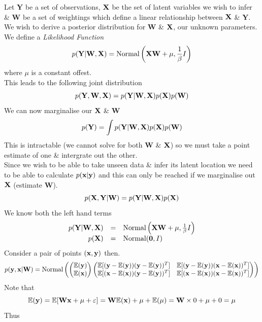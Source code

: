 \documentclass[11pt,a4paper]{article}
\begin{document}
Let $\textbf{Y}$ be a set of observations, $\textbf{X}$ be the set of latent variables we wish to infer \& $\textbf{W}$ be a set of weightings which define a linear relationship between $\textbf{X}$ \& $\textbf{Y}$.\\
We wish to derive a posterior distribution for $\textbf{W}$ \& $\textbf{X}$, our unknown parameters.\\
We define a \textit{Likelihood Function}
$$p(\textbf{Y}|\textbf{W},\textbf{X})=\text{Normal}\left(\textbf{X}\textbf{W}+\mu,\frac1\beta I\right)$$
where $\mu$ is a constant offest.\\
This leads to the following joint distribution
$$p(\textbf{Y},\textbf{W},\textbf{X})=p(\textbf{Y}|\textbf{W},\textbf{X})p(\textbf{X})p(\textbf{W})$$
We can now marginalise our $\textbf{X}$ \& $\textbf{W}$
$$p(\textbf{Y})=\int p(\textbf{Y}|\textbf{W},\textbf{X})p(\textbf{X})p(\textbf{W})$$
This is intractable (\ie we cannot solve for both $\textbf{W}$ \& $\textbf{X}$) so we must take a point estimate of one \& intergrate out the other.\\
Since we wish to be able to take unseen data \& infer its latent location we need to be able to calculate $p(\textbf{x}|\textbf{y})$ and this can only be reached if we marginalise out $\textbf{X}$ (\ie estimate $\textbf{W}$).\\
$$p(\textbf{X},\textbf{Y}|\textbf{W})=p(\textbf{Y}|\textbf{W},\textbf{X})p(\textbf{X})$$
We know both the left hand terms
\[\begin{array}{rcl}
p(\textbf{Y}|\textbf{W},\textbf{X})&=&\text{Normal}\left(\textbf{X}\textbf{W}+\mu,\frac{1}{\beta}I\right)\\
p(\textbf{X})&=&\text{Normal}(\textbf{0},I)
\end{array}\]
Consider a pair of points $(\textbf{x},\textbf{y})$ then.
$$p(\textbf{y},\textbf{x}|\textbf{W})=\text{Normal}\left(\begin{pmatrix}\mathbb{E}(\textbf{y})\\\mathbb{E}(\textbf{x})\end{pmatrix}\begin{pmatrix}\mathbb{E}[(\textbf{y}-\mathbb{E}(\textbf{y}))(\textbf{y}-\mathbb{E}(\textbf{y}))^T]&\mathbb{E}[(\textbf{y}-\mathbb{E}(\textbf{y}))(\textbf{x}-\mathbb{E}(\textbf{x}))^T]\\\mathbb{E}[(\textbf{x}-\mathbb{E}(\textbf{x}))(\textbf{y}-\mathbb{E}(\textbf{y}))^T]&\mathbb{E}[(\textbf{x}-\mathbb{E}(\textbf{x}))(\textbf{x}-\mathbb{E}(\textbf{x}))^T]\end{pmatrix}\right)$$
Note that
$$\mathbb{E}(\textbf{y})=\mathbb{E}[\textbf{W}\textbf{x}+\mu+\varepsilon]=\textbf{W}\mathbb{E}(\textbf{x})+\mu+\mathbb{E}(\mu)=\textbf{W}\times0+\mu+0=\mu$$
Thus
\end{document}
